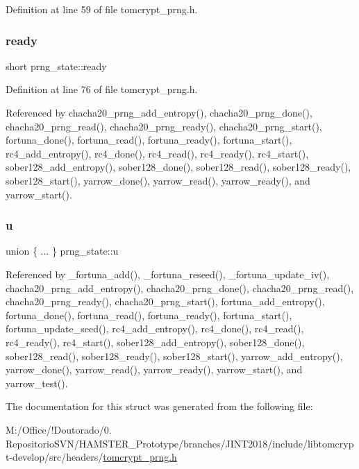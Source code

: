 Definition at line 59 of file tomcrypt\+\_\+prng.\+h.

\mbox{\label{structprng__state_ad5b2704260668ba49701ba0169286837}} 
\subsubsection{\texorpdfstring{ready}{ready}}
{\footnotesize\ttfamily short prng\+\_\+state\+::ready}



Definition at line 76 of file tomcrypt\+\_\+prng.\+h.



Referenced by chacha20\+\_\+prng\+\_\+add\+\_\+entropy(), chacha20\+\_\+prng\+\_\+done(), chacha20\+\_\+prng\+\_\+read(), chacha20\+\_\+prng\+\_\+ready(), chacha20\+\_\+prng\+\_\+start(), fortuna\+\_\+done(), fortuna\+\_\+read(), fortuna\+\_\+ready(), fortuna\+\_\+start(), rc4\+\_\+add\+\_\+entropy(), rc4\+\_\+done(), rc4\+\_\+read(), rc4\+\_\+ready(), rc4\+\_\+start(), sober128\+\_\+add\+\_\+entropy(), sober128\+\_\+done(), sober128\+\_\+read(), sober128\+\_\+ready(), sober128\+\_\+start(), yarrow\+\_\+done(), yarrow\+\_\+read(), yarrow\+\_\+ready(), and yarrow\+\_\+start().

\mbox{\label{structprng__state_a73ffeba26752871bc883f035a89f0991}} 
\subsubsection{\texorpdfstring{u}{u}}
{\footnotesize\ttfamily union \{ ... \}   prng\+\_\+state\+::u}



Referenced by \+\_\+fortuna\+\_\+add(), \+\_\+fortuna\+\_\+reseed(), \+\_\+fortuna\+\_\+update\+\_\+iv(), chacha20\+\_\+prng\+\_\+add\+\_\+entropy(), chacha20\+\_\+prng\+\_\+done(), chacha20\+\_\+prng\+\_\+read(), chacha20\+\_\+prng\+\_\+ready(), chacha20\+\_\+prng\+\_\+start(), fortuna\+\_\+add\+\_\+entropy(), fortuna\+\_\+done(), fortuna\+\_\+read(), fortuna\+\_\+ready(), fortuna\+\_\+start(), fortuna\+\_\+update\+\_\+seed(), rc4\+\_\+add\+\_\+entropy(), rc4\+\_\+done(), rc4\+\_\+read(), rc4\+\_\+ready(), rc4\+\_\+start(), sober128\+\_\+add\+\_\+entropy(), sober128\+\_\+done(), sober128\+\_\+read(), sober128\+\_\+ready(), sober128\+\_\+start(), yarrow\+\_\+add\+\_\+entropy(), yarrow\+\_\+done(), yarrow\+\_\+read(), yarrow\+\_\+ready(), yarrow\+\_\+start(), and yarrow\+\_\+test().



The documentation for this struct was generated from the following file\+:\begin{DoxyCompactItemize}
\item 
M\+:/\+Office/!\+Doutorado/0. Repositorio\+S\+V\+N/\+H\+A\+M\+S\+T\+E\+R\+\_\+\+Prototype/branches/\+J\+I\+N\+T2018/include/libtomcrypt-\/develop/src/headers/\mbox{\hyperlink{tomcrypt__prng_8h}{tomcrypt\+\_\+prng.\+h}}\end{DoxyCompactItemize}
